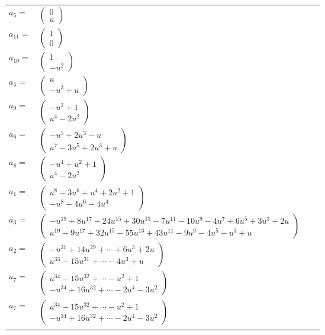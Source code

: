 \documentclass[1p]{elsarticle_modified}
\theoremstyle{definition}
\begin{document}
\begin{tabular}{m{7pt} m{180pt} m{7pt} m{180pt} }
\flushright $a_{5}=$&$\begin{pmatrix}0\\u\end{pmatrix}$ \\
\flushright $a_{11}=$&$\begin{pmatrix}1\\0\end{pmatrix}$ \\
\flushright $a_{10}=$&$\begin{pmatrix}1\\- u^2\end{pmatrix}$ \\
\flushright $a_{4}=$&$\begin{pmatrix}u\\- u^3+u\end{pmatrix}$ \\
\flushright $a_{9}=$&$\begin{pmatrix}- u^2+1\\u^4-2 u^2\end{pmatrix}$ \\
\flushright $a_{6}=$&$\begin{pmatrix}- u^5+2 u^3- u\\u^7-3 u^5+2 u^3+u\end{pmatrix}$ \\
\flushright $a_{8}=$&$\begin{pmatrix}- u^4+u^2+1\\u^4-2 u^2\end{pmatrix}$ \\
\flushright $a_{1}=$&$\begin{pmatrix}u^8-3 u^6+u^4+2 u^2+1\\- u^8+4 u^6-4 u^4\end{pmatrix}$ \\
\flushright $a_{3}=$&$\begin{pmatrix}- u^{19}+8 u^{17}-24 u^{15}+30 u^{13}-7 u^{11}-10 u^9-4 u^7+6 u^5+3 u^3+2 u\\u^{19}-9 u^{17}+32 u^{15}-55 u^{13}+43 u^{11}-9 u^9-4 u^5- u^3+u\end{pmatrix}$ \\
\flushright $a_{2}=$&$\begin{pmatrix}- u^{31}+14 u^{29}+\cdots+6 u^3+2 u\\u^{33}-15 u^{31}+\cdots-4 u^3+u\end{pmatrix}$ \\
\flushright $a_{7}=$&$\begin{pmatrix}u^{34}-15 u^{32}+\cdots- u^2+1\\- u^{34}+16 u^{32}+\cdots-2 u^4-3 u^2\end{pmatrix}$\\ \flushright $a_{7}=$&$\begin{pmatrix}u^{34}-15 u^{32}+\cdots- u^2+1\\- u^{34}+16 u^{32}+\cdots-2 u^4-3 u^2\end{pmatrix}$\\&\end{tabular}
\end{document}

